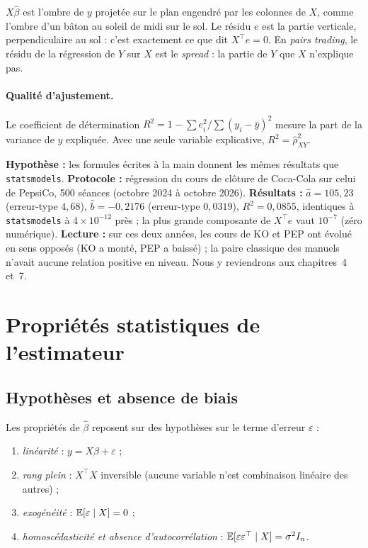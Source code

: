 \begin{intuition}
$X\hat\beta$ est l'ombre de $y$ projetée sur le plan engendré par les colonnes de $X$, comme l'ombre d'un bâton au soleil de midi sur le sol. Le résidu $e$ est la partie verticale, perpendiculaire au sol : c'est exactement ce que dit $X^\top e = 0$. En \emph{pairs trading}, le résidu de la régression de $Y$ sur $X$ est le \emph{spread} : la partie de $Y$ que $X$ n'explique pas.
\end{intuition}

\paragraph{Qualité d'ajustement.} Le coefficient de détermination $R^2 = 1 - \sum e_i^2/\sum(y_i-\bar y)^2$ mesure la part de la variance de $y$ expliquée. Avec une seule variable explicative, $R^2 = \hat\rho_{XY}^2$.

\begin{codebox}
\textbf{Hypothèse :} les formules écrites à la main donnent les mêmes résultats que \texttt{statsmodels}. \textbf{Protocole :} régression du cours de clôture de Coca-Cola sur celui de PepsiCo, 500 séances (octobre 2024 à octobre 2026). \textbf{Résultats :} $\hat a = 105{,}23$ (erreur-type $4{,}68$), $\hat b = -0{,}2176$ (erreur-type $0{,}0319$), $R^2 = 0{,}0855$, identiques à \texttt{statsmodels} à $4\times10^{-12}$ près ; la plus grande composante de $X^\top e$ vaut $10^{-7}$ (zéro numérique). \textbf{Lecture :} sur ces deux années, les cours de KO et PEP ont évolué en sens opposés (KO a monté, PEP a baissé) ; la \og paire classique\fg{} des manuels n'avait aucune relation positive en niveau. Nous y reviendrons aux chapitres~4 et~7.
\end{codebox}

\section{Propriétés statistiques de l'estimateur}

\subsection{Hypothèses et absence de biais}

Les propriétés de $\hat\beta$ reposent sur des hypothèses sur le terme d'erreur $\varepsilon$ :
\begin{enumerate}[label=(H\arabic*)]
\item \emph{linéarité} : $y = X\beta + \varepsilon$ ;
\item \emph{rang plein} : $X^\top X$ inversible (aucune variable n'est combinaison linéaire des autres) ;
\item \emph{exogénéité} : $\mathbb{E}[\varepsilon \mid X] = 0$ ;
\item \emph{homoscédasticité et absence d'autocorrélation} : $\mathbb{E}[\varepsilon\varepsilon^\top \mid X] = \sigma^2 I_n$.
\end{enumerate}

